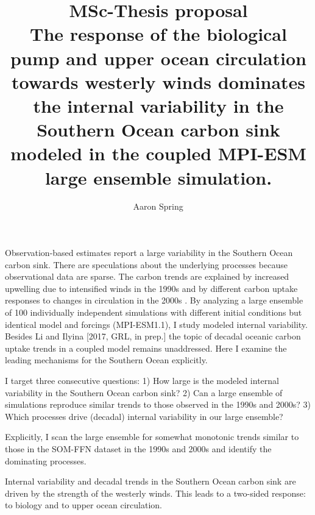 \documentclass[12pt]{article}
\title{\vspace{-2cm} \textbf{MSc-Thesis proposal} \\ \vspace{1cm} The response of the biological pump and upper ocean circulation towards westerly winds dominates the internal variability in the Southern Ocean carbon sink modeled in the coupled MPI-ESM large ensemble simulation.}
\author
{Aaron Spring$^{}$%
}
\date{}
\begin{document}
 


\baselineskip24pt


\maketitle 

Observation-based estimates report a large variability in the Southern Ocean carbon sink. There are speculations about the underlying processes because observational data are sparse. The carbon trends are explained by increased upwelling due to intensified winds in the 1990s \citep{LeQuere2007,DeVries2017} and by different carbon uptake responses to changes in circulation in the 2000s \citep{landschuetzer2015}. By analyzing a large ensemble of 100 individually independent simulations with different initial conditions but identical model and forcings (MPI-ESM1.1), I study modeled internal variability. Besides Li and Ilyina [2017, GRL, in prep.] the topic of decadal oceanic carbon uptake trends in a coupled model remains unaddressed. Here I examine the leading mechanisms for the Southern Ocean explicitly.


I target three consecutive questions: 1) How large is the modeled internal variability in the Southern Ocean carbon sink? 2) Can a large ensemble of simulations reproduce similar trends to those observed in the 1990s and 2000s? 3) Which processes drive (decadal) internal variability in our large ensemble?

Explicitly, I scan the large ensemble for somewhat monotonic trends similar to those in the SOM-FFN dataset \citep{landschuetzer2015} in the 1990s and 2000s and identify the dominating processes. %

Internal variability and decadal trends in the Southern Ocean carbon sink are driven by the strength of the westerly winds. This leads to a two-sided response: to biology and to upper ocean circulation.
\end{document}
